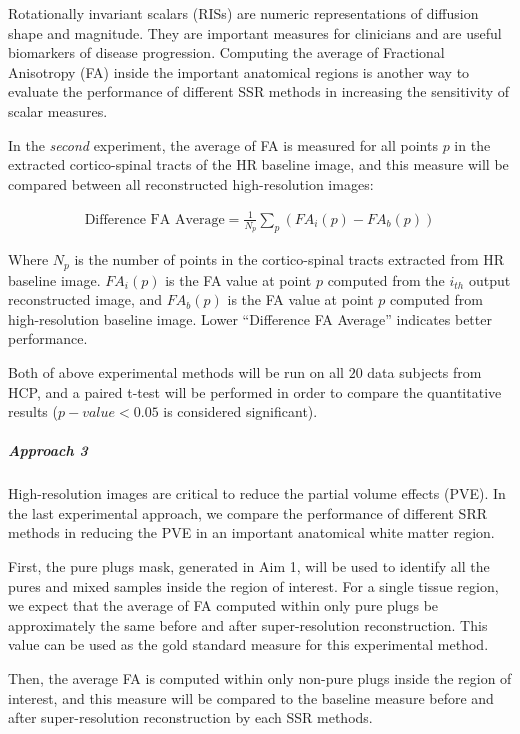 Rotationally invariant scalars (RISs) are numeric representations
of diffusion shape and magnitude. They are important measures for clinicians and are useful biomarkers of disease progression.
Computing the average of Fractional Anisotropy (FA) inside the important anatomical regions is another way to evaluate the performance of different SSR methods in increasing the sensitivity of scalar measures.

In the \textit{second} experiment, the average of FA is measured for all points $p$ in the extracted cortico-spinal tracts of the HR baseline image, and this measure will be compared between all reconstructed high-resolution images:

\begin{equation}
\label{eq:avgFA}
\begin{gathered}
\text{Difference FA Average} = \frac{1}{N_p}\sum_{p} (FA_i(p) - FA_b(p))
\end{gathered}
\end{equation}

Where $N_p$ is the number of points in the cortico-spinal tracts extracted from HR baseline image. 
$FA_i(p)$ is the FA value at point $p$ computed from the $i_{th}$ output reconstructed image, and $FA_b(p)$ is the FA value at point $p$ computed from high-resolution baseline image.
Lower ``Difference FA Average'' indicates better performance.

Both of above experimental methods will be run on all $20$ data subjects from HCP, and a paired t-test will be performed in order to compare the quantitative results ($p-value < 0.05$ is considered significant).

\subparagraph*{Approach 3}

High-resolution images are critical to reduce the partial volume effects (PVE). In the last experimental approach, we compare the performance of different SRR methods in reducing the PVE in an important anatomical white matter region.

First, the pure plugs mask, generated in Aim 1, will be used to identify all the pures and mixed samples inside the region of interest.
For a single tissue region, we expect that the average of FA computed within only pure plugs be approximately the same before and after super-resolution reconstruction. This value can be used as the gold standard measure for this experimental method.

Then, the average FA is computed within only non-pure plugs inside the region of interest, and this measure will be compared to the baseline measure before and after super-resolution reconstruction by each SSR methods.

